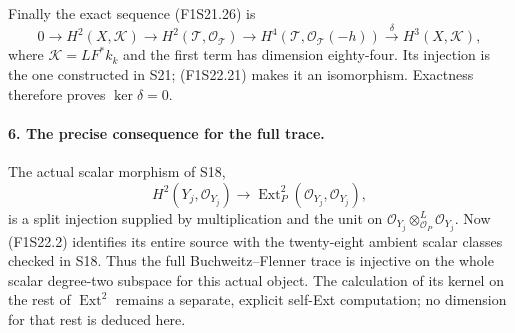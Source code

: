 Finally the exact sequence (F1S21.26) is
\[
 0\longrightarrow H^2(X,\mathcal K)
 \longrightarrow H^2(\mathcal T,\mathcal O_{\mathcal T})
 \longrightarrow H^4(\mathcal T,\mathcal O_{\mathcal T}(-h))
 \xrightarrow{\delta}H^3(X,\mathcal K),
 \tag{F1S22.22}
\]
where $\mathcal K=LF^*k_k$ and the first term has
dimension eighty-four. Its injection is the one
constructed in S21; (F1S22.21) makes it an isomorphism.
Exactness therefore proves $\ker\delta=0$.

\paragraph{6. The precise consequence for the full trace.}
The actual scalar morphism of S18,
\[
 H^2(Y_j,\mathcal O_{Y_j})\longrightarrow
 \operatorname{Ext}^2_P(\mathcal O_{Y_j},\mathcal O_{Y_j}),
 \tag{F1S22.23}
\]
is a split injection supplied by multiplication and the
unit on $\mathcal O_{Y_j}\otimes^L_{\mathcal O_P}\mathcal O_{Y_j}$.
Now (F1S22.2) identifies its entire source with the
twenty-eight ambient scalar classes checked in S18.
Thus the full Buchweitz--Flenner trace is injective on
the whole scalar degree-two subspace for this actual
object. The calculation of its kernel on the rest of
$\operatorname{Ext}^2$ remains a separate, explicit
self-Ext computation; no dimension for that rest is
deduced here.

